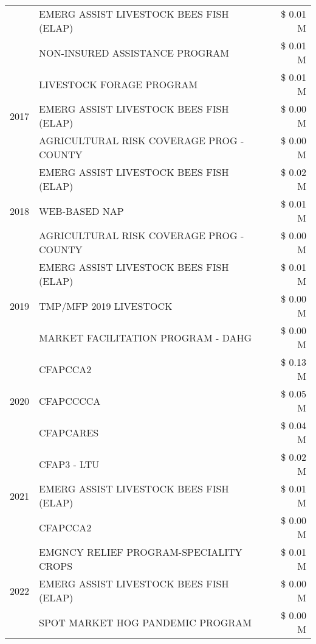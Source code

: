 \begin{tabular}{llr}
 & EMERG ASSIST LIVESTOCK BEES FISH (ELAP) & \$ 0.01 M \\
 & NON-INSURED ASSISTANCE PROGRAM & \$ 0.01 M \\
\cline{1-3}
\multirow[t]{3}{*}{2017} & LIVESTOCK FORAGE PROGRAM & \$ 0.01 M \\
 & EMERG ASSIST LIVESTOCK BEES FISH (ELAP) & \$ 0.00 M \\
 & AGRICULTURAL RISK COVERAGE PROG - COUNTY & \$ 0.00 M \\
\cline{1-3}
\multirow[t]{3}{*}{2018} & EMERG ASSIST LIVESTOCK BEES FISH (ELAP) & \$ 0.02 M \\
 & WEB-BASED NAP & \$ 0.01 M \\
 & AGRICULTURAL RISK COVERAGE PROG - COUNTY & \$ 0.00 M \\
\cline{1-3}
\multirow[t]{3}{*}{2019} & EMERG ASSIST LIVESTOCK BEES FISH (ELAP) & \$ 0.01 M \\
 & TMP/MFP 2019 LIVESTOCK & \$ 0.00 M \\
 & MARKET FACILITATION PROGRAM - DAHG & \$ 0.00 M \\
\cline{1-3}
\multirow[t]{3}{*}{2020} & CFAPCCA2 & \$ 0.13 M \\
 & CFAPCCCCA & \$ 0.05 M \\
 & CFAPCARES & \$ 0.04 M \\
\cline{1-3}
\multirow[t]{3}{*}{2021} & CFAP3 - LTU & \$ 0.02 M \\
 & EMERG ASSIST LIVESTOCK BEES FISH (ELAP) & \$ 0.01 M \\
 & CFAPCCA2 & \$ 0.00 M \\
\cline{1-3}
\multirow[t]{3}{*}{2022} & EMGNCY RELIEF PROGRAM-SPECIALITY CROPS & \$ 0.01 M \\
 & EMERG ASSIST LIVESTOCK BEES FISH (ELAP) & \$ 0.00 M \\
 & SPOT MARKET HOG PANDEMIC PROGRAM & \$ 0.00 M \\
\cline{1-3}
\bottomrule
\end{tabular}
